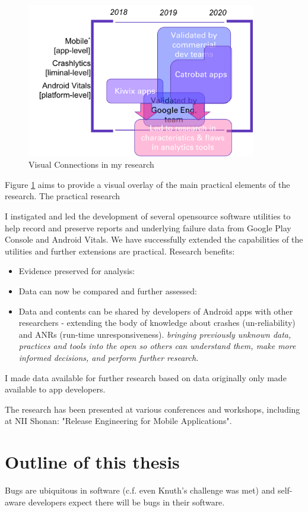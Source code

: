 \begin{figure}[ht]
    \centering
    \includegraphics[width=10cm]{images/visual-connections-in-research.png}
    \caption{Visual Connections in my research}
    \label{fig:visual-connections-in-research}
\end{figure}

Figure \ref{fig:visual-connections-in-research} aims to provide a visual overlay of the main practical elements of the research. The practical research  

I instigated and led the development of several opensource software utilities to help record and preserve reports and underlying failure data from Google Play Console and Android Vitals. We have successfully extended the capabilities of the utilities and further extensions are practical. Research benefits:
\begin{itemize}
    \item Evidence preserved for analysis:
    \item Data can now be compared and further assessed:
    \item Data and contents can be shared by developers of Android apps with other researchers - extending the body of knowledge about crashes (un-reliability) and ANRs (run-time unresponsiveness). \emph{bringing previously unknown data, practices and tools into the open so others can understand them, make more informed decisions, and perform further research.}
\end{itemize}

I made data available for further research based on data originally only made available to app developers.

The research has been presented at various conferences and workshops, including at NII Shonan: "Release Engineering for Mobile Applications". 

\section{Outline of this thesis}
Bugs are ubiquitous in software (c.f. even Knuth's challenge was met) and self-aware developers expect there will be bugs in their software. 

